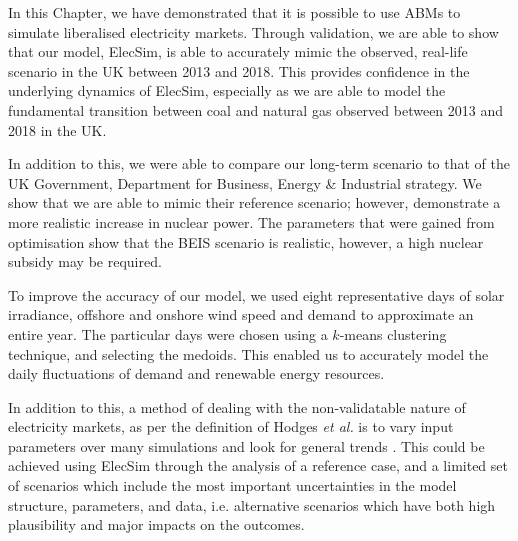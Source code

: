 



In this Chapter, we have demonstrated that it is possible to use ABMs to simulate liberalised electricity markets. Through validation, we are able to show that our model, ElecSim, is able to accurately mimic the observed, real-life scenario in the UK between 2013 and 2018. This provides confidence in the underlying dynamics of ElecSim, especially as we are able to model the fundamental transition between coal and natural gas observed between 2013 and 2018 in the UK.

In addition to this, we were able to compare our long-term scenario to that of the UK Government, Department for Business, Energy \& Industrial strategy. We show that we are able to mimic their reference scenario; however, demonstrate a more realistic increase in nuclear power. The parameters that were gained from optimisation show that the BEIS scenario is realistic, however, a high nuclear subsidy may be required.

To improve the accuracy of our model, we used eight representative days of solar irradiance, offshore and onshore wind speed and demand to approximate an entire year. The particular days were chosen using a $k$-means clustering technique, and selecting the medoids. This enabled us to accurately model the daily fluctuations of demand and renewable energy resources. 



In addition to this, a method of dealing with the non-validatable nature of electricity markets, as per the definition of Hodges \textit{et al.} is to vary input parameters over many simulations and look for general trends \cite{Hodges}. This could be achieved using ElecSim through the analysis of a reference case, and a limited set of scenarios which include the most important uncertainties in the model structure, parameters, and data, i.e. alternative scenarios which have both high plausibility and major impacts on the outcomes.

